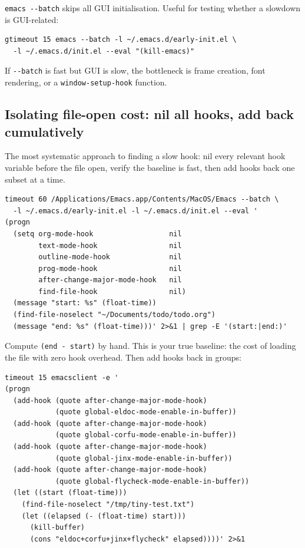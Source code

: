 \texttt{emacs -\/-batch} skips all GUI initialisation. Useful for testing whether a slowdown is GUI-related:

\begin{verbatim}
gtimeout 15 emacs --batch -l ~/.emacs.d/early-init.el \
  -l ~/.emacs.d/init.el --eval "(kill-emacs)"
\end{verbatim}

If \texttt{-\/-batch} is fast but GUI is slow, the bottleneck is frame creation, font rendering, or a \texttt{window-setup-hook} function.

\subsection{Isolating file-open cost: nil all hooks, add back cumulatively}\label{isolating-file-open-cost-nil-all-hooks-add-back-cumulatively}

The most systematic approach to finding a slow hook: nil every relevant hook variable before the file open, verify the baseline is fast, then add hooks back one subset at a time.

\begin{verbatim}
timeout 60 /Applications/Emacs.app/Contents/MacOS/Emacs --batch \
  -l ~/.emacs.d/early-init.el -l ~/.emacs.d/init.el --eval '
(progn
  (setq org-mode-hook                  nil
        text-mode-hook                 nil
        outline-mode-hook              nil
        prog-mode-hook                 nil
        after-change-major-mode-hook   nil
        find-file-hook                 nil)
  (message "start: %s" (float-time))
  (find-file-noselect "~/Documents/todo/todo.org")
  (message "end: %s" (float-time)))' 2>&1 | grep -E '(start:|end:)'
\end{verbatim}

Compute \texttt{(end - start)} by hand. This is your true baseline: the cost of loading the file with zero hook overhead. Then add hooks back in groups:

\begin{verbatim}
timeout 15 emacsclient -e '
(progn
  (add-hook (quote after-change-major-mode-hook)
            (quote global-eldoc-mode-enable-in-buffer))
  (add-hook (quote after-change-major-mode-hook)
            (quote global-corfu-mode-enable-in-buffer))
  (add-hook (quote after-change-major-mode-hook)
            (quote global-jinx-mode-enable-in-buffer))
  (add-hook (quote after-change-major-mode-hook)
            (quote global-flycheck-mode-enable-in-buffer))
  (let ((start (float-time)))
    (find-file-noselect "/tmp/tiny-test.txt")
    (let ((elapsed (- (float-time) start)))
      (kill-buffer)
      (cons "eldoc+corfu+jinx+flycheck" elapsed))))' 2>&1
\end{verbatim}

